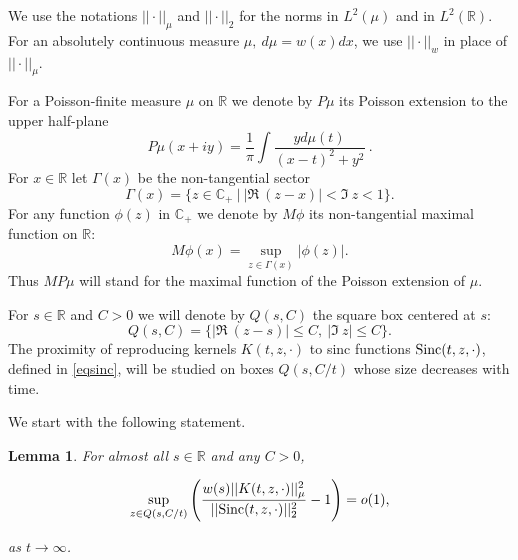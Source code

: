 \documentclass[11pt,twoside,reqno]{amsart}
\def\to{\rightarrow}
\def\R{{\mathbb R}}
\def\C{{\mathbb{C}}}
\def\G{\Gamma}
\def\S{\text{\rm Sinc}}
\theoremstyle{plain}
\newtheorem{lemma}{Lemma}
\numberwithin{equation}{section}
\begin{document}
We use the notations $||\cdot ||_\mu$ and $||\cdot ||_2$ for the norms
in $L^2(\mu)$ and in $L^2(\R)$. For an absolutely continuous measure $\mu,\ d\mu=w(x)dx$, we use $||\cdot||_w$ in
place of $||\cdot||_\mu$.

For a Poisson-finite measure $\mu$ on $\R$ we denote by $P\mu$ its Poisson extension to the upper half-plane
$$P\mu(x+iy)=\frac 1\pi\int\frac{yd\mu(t)}{(x-t)^2+y^2}\ .$$
For $x\in\R$ let $\Gamma(x)$ be the non-tangential sector
$$\G(x)=\{ z\in\C_+\ |\ |\Re\  (z-x)|<\Im\  z <1  \}.
$$
For any function $\phi(z)$ in $\C_+$ we denote by $M\phi$ its non-tangential maximal function on $\R$:
$$M\phi(x)=\sup_{z\in \G(x)} |\phi(z)|.$$
Thus $MP\mu$ will stand for the maximal function of the Poisson extension of $\mu$.


For $s\in\R$ and $C>0$ we will denote by $Q(s,C)$ the square box centered at $s$:
$$Q(s,C)=\{ |\Re\ (z-s)|\leq C, \ |\Im\  z|\leq C     \}.$$
The proximity of reproducing kernels $K(t,z, \cdot)$ to sinc functions $\S(t,z, \cdot)$, defined in \eqref{eqsinc}, will be studied on
boxes $Q(s,C/t)$ whose size decreases with time.

We start with the following statement.


\begin{lemma}\label{lem1200}  For almost all $s\in \R$ and any $C>0$,

\begin{equation} \sup_{z\in Q(s,C/t)}\left(\frac{w(s)||K(t,z, \cdot)||^2_{\mu}}{||\S(t,z, \cdot)||^2_2}-1\right)= o(1),\label{eq1001}\end{equation}

 as $t\to\infty$.
\end{lemma}
\end{document}

